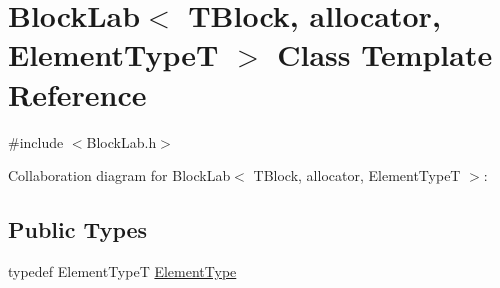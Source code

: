 \hypertarget{class_block_lab}{}\section{Block\+Lab$<$ T\+Block, allocator, Element\+Type\+T $>$ Class Template Reference}
\label{class_block_lab}


{\ttfamily \#include $<$Block\+Lab.\+h$>$}



Collaboration diagram for Block\+Lab$<$ T\+Block, allocator, Element\+Type\+T $>$\+:
\subsection*{Public Types}
\begin{DoxyCompactItemize}
\item 
typedef Element\+Type\+T \hyperlink{class_block_lab_accdcd2d5e815a8497e5ef9ae884da6b6}{Element\+Type}
\end{DoxyCompactItemize}
